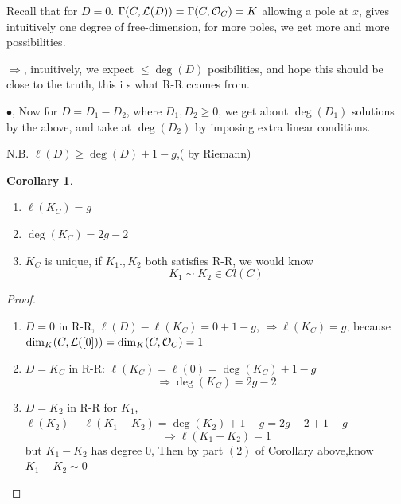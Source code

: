 \documentclass[11pt]{article}
\theoremstyle{definition}
\newtheorem{cor}[thm]{Corollary}
\newcommand{\call}{{\cal L}}
\newcommand{\calo}{{\cal O}}
\newcommand{\Lrta}{\Longrightarrow}
\begin{document}
 Recall that for $D=0$. $\Gamma(C,\call(D))=\Gamma(C,\calo_C)=K$ allowing a pole at $x$, gives intuitively one degree of free-dimension, for more poles, we get more and more possibilities.

 $\Lrta$, intuitively, we expect $\leq \deg(D)$ posibilities, and hope this should be close to the truth, this i s what R-R ccomes from.

 $\bullet$, Now for $D=D_1-D_2$, where $D_1,D_2\geq 0$, we get about $\deg(D_1)$ solutions by the above, and take at $\deg(D_2)$ by imposing extra linear conditions.

 N.B. $\ell(D)\geq \deg(D)+1-g$,( by Riemann)

 \begin{cor}
\begin{enumerate}[label=(\arabic*)]\ 
\item $\ell(K_C)=g$
\item $\deg(K_C)=2g-2$
\item $K_C$ is unique, if $K_1.,K_2$ both satisfies R-R, we would know
$$
K_1\sim K_2\in Cl(C)
$$
\end{enumerate}
 \end{cor}
 \begin{proof}
 \begin{enumerate}[label=\arabic*]
 \item $D=0$ in R-R, $\ell(D)-\ell(K_C)=0+1-g$, $\Lrta \ell(K_C)=g$, because $\dim_K(C,\call([0]))=\dim_K(C,\calo_C)=1$
 \item $D=K_C$ in R-R: $\ell(K_C)=\ell(0)=\deg(K_C)+1-g$
 $$
\Lrta \deg(K_C)=2g-2
 $$
\item $D=K_2$ in R-R for $K_1$, $\ell(K_2)-\ell(K_1-K_2)=\deg(K_2)+1-g=2g-2+1-g$
$$
\Lrta \ell(K_1-K_2)=1
$$
but $K_1-K_2$ has degree $0$, Then by part $(2)$ of Corollary above,know
$K_1-K_2\sim 0$
 \end{enumerate}
 \end{proof}
\end{document}
